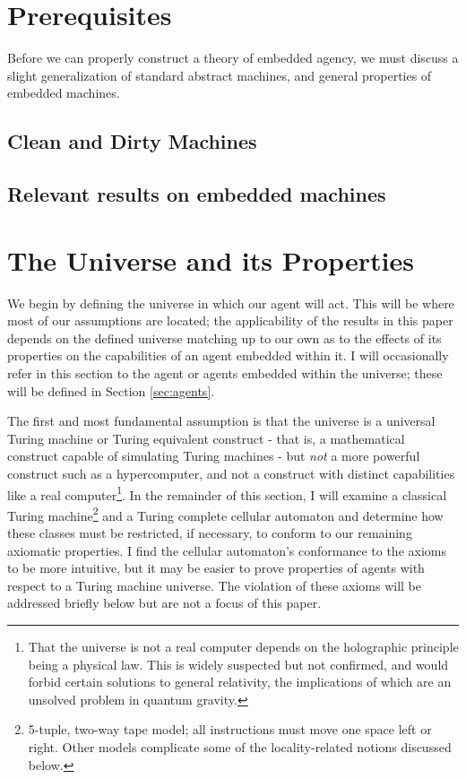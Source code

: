 \documentclass[12pt]{article}
\theoremstyle{definition}
\begin{document}
\section{Prerequisites}
\label{sec:prereqs}

Before we can properly construct a theory of embedded agency, we must discuss a
slight generalization of standard abstract machines, and general properties of
embedded machines.

\subsection{Clean and Dirty Machines}
\label{sec:dirty}


\subsection{Relevant results on embedded machines}
\label{sec:embedding}


\section{The Universe and its Properties}
\label{sec:universe}

We begin by defining the universe in which our agent will act. This will be
where most of our assumptions are located; the applicability of the results in
this paper depends on the defined universe matching up to our own as to the
effects of its properties on the capabilities of an agent embedded within it. I
will occasionally refer in this section to the agent or agents embedded within
the universe; these will be defined in Section \ref{sec:agents}.

The first and most fundamental assumption is that the universe is a universal
Turing machine or Turing equivalent construct - that is, a mathematical
construct capable of simulating Turing machines - but \textit{not} a more
powerful construct such as a hypercomputer, and not a construct with distinct
capabilities like a real computer\footnote{That the universe is not a real
computer depends on the holographic principle being a physical law. This is
widely suspected but not confirmed, and would forbid certain solutions to
general relativity, the implications of which are an unsolved problem in quantum
gravity.}. In the remainder of this section, I will examine a classical Turing
machine\footnote{5-tuple, two-way tape model; all instructions must move one
space left or right. Other models complicate some of the locality-related
notions discussed below.} and a Turing complete cellular automaton and determine
how these classes must be restricted, if necessary, to conform to our remaining
axiomatic properties. I find the cellular automaton's conformance to the axioms
to be more intuitive\footnotemark, but it may be easier to prove properties of
agents with respect to a Turing machine universe. The violation of these axioms
will be addressed briefly below but are not a focus of this paper.
\end{document}
